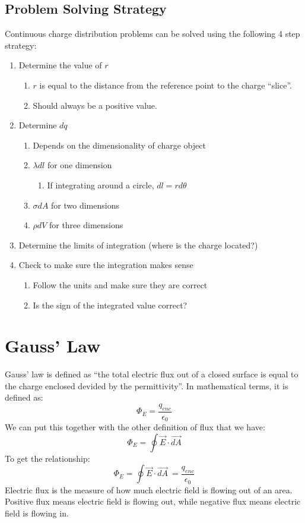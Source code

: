 \documentclass{article}
\begin{document}
\subsection{Problem Solving Strategy}
Continuous charge distribution problems can be solved using the following 4 step strategy:
\begin{enumerate}
\item Determine the value of $r$
  \begin{enumerate}
  \item $r$ is equal to the distance from the reference point to the charge ``slice''.
  \item Should always be a positive value.
  \end{enumerate}
\item Determine $dq$
  \begin{enumerate}
  \item Depends on the dimensionality of charge object
  \item $\lambda dl$ for one dimension
    \begin{enumerate}
    \item If integrating around a circle, $dl = rd\theta$
    \end{enumerate}
  \item $\sigma dA$ for two dimensions
  \item $\rho dV$ for three dimensions
  \end{enumerate}
\item Determine the limits of integration (where is the charge located?)
\item Check to make sure the integration makes sense
  \begin{enumerate}
  \item Follow the units and make sure they are correct
  \item Is the sign of the integrated value correct?
  \end{enumerate}
\end{enumerate}
\section{Gauss' Law}
Gauss' law is defined as ``the total electric flux out of a closed surface is equal to the charge enclosed devided by the permittivity''.  In mathematical terms, it is defined as:
\[\Phi_E = \frac{q_{enc}}{\epsilon_0}\]
We can put this together with the other definition of flux that we have:
\[\Phi_E = \oint\vec{E}\cdot\vec{dA}\]
To get the relationship:
\[\Phi_E = \oint\vec{E}\cdot\vec{dA}\ = \frac{q_{enc}}{\epsilon_0}\]
Electric flux is the measure of how much electric field is flowing out of an area.  Positive flux means electric field is flowing out, while negative flux means electric field is flowing in.
\end{document}
